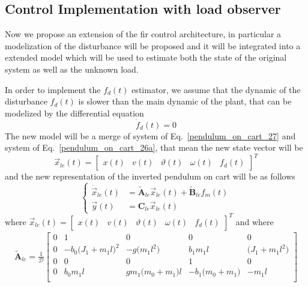 \documentclass[12pt,a4paper,oneside]{book}
\begin{document}
\begin{onehalfspace}
\subsection{Control Implementation with load observer}
Now we propose an extension of the fir control architecture, in particular a modelization of the disturbance will be proposed and it will be integrated into a extended model which will be used to estimate both the state of the original system as well as the unknown load. 

In order to implement the $f_d(t)$ estimator, we assume that the dynamic of the disturbance $f_d(t)$ is slower than the main dynamic of the plant, that can be modelized by the differential equation
\begin{equation}\label{pendulum_on_cart_26a}
	\dot{f}_d(t)=0
\end{equation}
The new model will be a merge of system of Eq.~\eqref{pendulum_on_cart_27} and system of Eq.~\eqref{pendulum_on_cart_26a}, that mean the new state vector will be
\begin{equation}\label{pendulum_on_cart_26b}
	\vec{x}_{le}(t)=\begin{bmatrix} x(t)&v(t)&\vartheta(t)&\omega(t)&f_d(t) \end{bmatrix}^T
\end{equation}
and the new representation of the inverted pendulum on cart will be as follows
\begin{equation}\label{pendulum_on_cart_26}
	\left\lbrace 	\begin{aligned}
		\dot{\vec{x}}_{le}(t)&=\tilde{\mathbf{A}}_{le}\vec{x}_{le}(t)+ 
		\tilde{\mathbf{B}}_{le}f_m(t) \\[6pt]
		\vec{y}(t)&=\mathbf{C}_{le}\vec{x}_{le}(t)
	\end{aligned}\right. 
\end{equation}
where $\vec{x}_{le}(t)=\begin{bmatrix}
	x(t)&v(t)&\vartheta(t)&\omega(t)&f_d(t)
\end{bmatrix}^T$ and where
\begin{equation}\label{pendulum_on_cart_27}
	\begin{aligned}
		\tilde{\mathbf{A}}_{le}=\frac{1}{\mathcal{D}}\begin{bmatrix}
			0&1&0&0&0 \\[8pt]		
			0&-b_0\big(J_1+m_1l\big)^2&-g\big(m_1l^2\big)&b_1m_1l&\big(J_1+m_1l^2\big) \\[8pt]
			0&0&0&1&0 \\[8pt]
			0&b_0m_1l&gm_1\big(m_0+m_1\big)l&-b_1\big(m_0+m_1\big)& -m_1l \\[8pt]

\end{bmatrix}
\end{aligned}
\end{equation}
\end{onehalfspace}
\end{document}
